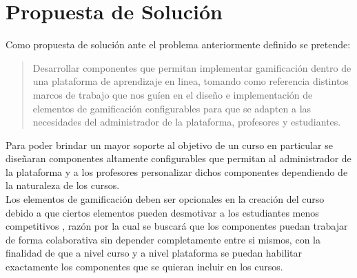 
 \clearpage

\section{Propuesta de Solución} \label{sec:propuesta}

 \noindent Como propuesta de solución ante el problema anteriormente definido se 
 pretende:

    \begin{quote}
    \colorbox{blue!05}{\parbox{\dimexpr\linewidth-2\fboxsep}{\strut%
        Desarrollar componentes que permitan implementar gamificación dentro
        de una plataforma de aprendizaje en linea, tomando como referencia
        distintos marcos de trabajo que nos guíen en el diseño e implementación
        de elementos de gamificación configurables para que se adapten a las
        necesidades del administrador de la plataforma, profesores y estudiantes.
    \strut}}%
    \end{quote}

 \noindent Para poder brindar un mayor soporte al objetivo de un curso en particular 
 se diseñaran componentes altamente configurables que permitan al administrador de la
 plataforma y a los profesores personalizar dichos componentes dependiendo de la 
 naturaleza de los cursos.\\

 \noindent Los elementos de gamificación deben ser opcionales en la creación del 
 curso debido a que ciertos elementos pueden desmotivar a los estudiantes menos 
 competitivos \cite{GamInE-Learning}, razón por la cual se buscará que los componentes
 puedan trabajar de forma colaborativa sin depender completamente entre si mismos,
 con la finalidad de que a nivel curso y a nivel plataforma se puedan habilitar 
 exactamente los componentes que se quieran incluir en los cursos.\\

